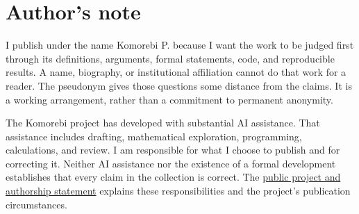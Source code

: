 \documentclass[11pt,oneside,openany]{book}
\begin{document}
\hypersetup{pageanchor=false}
\begin{titlepage}
\thispagestyle{empty}
\pagecolor{Ink}\color{CoverLight}
\par
\vspace{0.24in}
\noindent{\color{Accent}\rule{\textwidth}{1.5pt}}\par
\vspace{0.65in}
\vspace{0.42in}
\vfill
{}\par
\vspace{0.18in}
\end{titlepage}
\nopagecolor\color{Ink}
\frontmatter
\hypersetup{pageanchor=true}
\chapter*{Author's note}
I publish under the name Komorebi P. because I want the work to be judged first through its definitions, arguments, formal statements, code, and reproducible results. A name, biography, or institutional affiliation cannot do that work for a reader. The pseudonym gives those questions some distance from the claims. It is a working arrangement, rather than a commitment to permanent anonymity.

The Komorebi project has developed with substantial AI assistance. That assistance includes drafting, mathematical exploration, programming, calculations, and review. I am responsible for what I choose to publish and for correcting it. Neither AI assistance nor the existence of a formal development establishes that every claim in the collection is correct. The \href{https://komorebip.github.io/Operation-KOMOREBI/collection/PROJECT_STATEMENT.html}{public project and authorship statement} explains these responsibilities and the project's publication circumstances.
\end{document}
